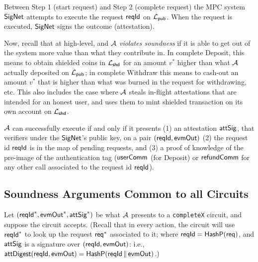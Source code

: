 Between Step 1 (start request) and Step 2  (complete request)  the MPC system $\mathsf{SigNet}$ attempts to execute the
request $\mathsf{reqId}$ on $\mathcal{L}_{\mathsf{pub}}$. When the request is executed, $\mathsf{SigNet}$ signs the outcome (attestation).


\vspace{5pt}
Now, recall that at high-level, and $\mathcal{A}$  \emph{violates soundness} if it is able to get out of the system more value than what they contribute in.
In complete Deposit, this means to obtain shielded coins  in $\mathcal{L}_{\mathsf{shd}}$ for an amount $v^*$ higher than what $\mathcal{A}$ actually deposited on $\mathcal{L}_{\mathsf{pub}}$; in complete Withdraw this means to cash-out an amount $v^*$ that is higher than what was burned in the request for withdrawing, etc.
This also includes the case where $\mathcal{A}$ steals in-flight attestations that are intended for an honest user, and uses them to mint shielded transaction on its own account on $\mathcal{L}_{\mathsf{shd}}$.

$\mathcal{A}$  can successfully execute    if and only if it presents  (1) an  attestation $\mathsf{attSig}$, that verifiers under the $\mathsf{SigNet}$'s public key, on a pair $(\mathsf{reqId},\mathsf{evmOut})$  (2)  the request id $\mathsf{reqId}$  is in the map of pending requests,   and (3) a proof of knowledge of the pre-image of the authentication tag ($\mathsf{userComm}$ (for Deposit) or $\mathsf{refundComm}$ for any other call associated to the request id $\mathsf{reqId}$).


\subsection{Soundness Arguments Common to all Circuits}
\label{subsec:soudnesscommon}

Let $(\mathsf{reqId}^*, \mathsf{evmOut}^*, \mathsf{attSig}^*)$ be what $\mathcal{A}$ presents to a \texttt{completeX} circuit, and suppose the circuit accepts.
(Recall that in every    action, the circuit will use $\mathsf{reqId}^*$ to look up the request $\mathsf{req}^*$
associated to it;   where $\mathsf{reqId}=\mathsf{HashP}(\mathsf{req})$, and  $\mathsf{attSig}$ is a signature over  $(\mathsf{reqId}, \mathsf{evmOut})$: i.e.,  $\mathsf{attDigest}(\mathsf{reqId}, \mathsf{evmOut}) = \mathsf{HashP}(\mathsf{reqId} \,\|\, \mathsf{evmOut})$.)



